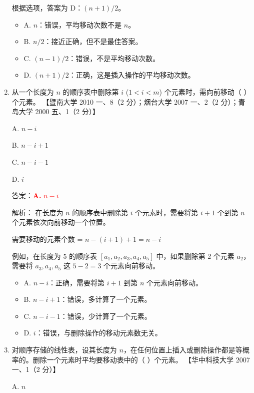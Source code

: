 \documentclass[lang=cn,newtx,10pt,scheme=chinese]{../../../elegantbook}
\begin{document}
\begin{enumerate}
        根据选项，答案为 D：$(n+1)/2$。

        \begin{itemize}
            \item A. $n$：错误，平均移动次数不是 $n$。
            \item B. $n/2$：接近正确，但不是最佳答案。
            \item C. $(n-1)/2$：错误，不是平均移动次数。
            \item D. $(n+1)/2$：正确，这是插入操作的平均移动次数。
        \end{itemize}

        \item 从一个长度为 $n$ 的顺序表中删除第 $i$ ($1 < i < m$) 个元素时，需向前移动（ ）个元素。  
        【暨南大学 2010 一、8（2 分）；烟台大学 2007 一、2（2 分）；青岛大学 2000 五、1（2 分）】  
    
        A. $n-i$  
    
        B. $n-i+1$  
    
        C. $n-i-1$  
    
        D. $i$  

        答案：\textcolor{red}{\textbf{A.} $n-i$}

        解析：
        在长度为 $n$ 的顺序表中删除第 $i$ 个元素时，需要将第 $i+1$ 个到第 $n$ 个元素依次向前移动一个位置。

        需要移动的元素个数 = $n - (i+1) + 1 = n - i$

        例如，在长度为 5 的顺序表 $[a_1, a_2, a_3, a_4, a_5]$ 中，如果删除第 2 个元素 $a_2$，需要将 $a_3, a_4, a_5$ 这 $5-2=3$ 个元素向前移动。

        \begin{itemize}
            \item A. $n-i$：正确，需要将第 $i+1$ 到第 $n$ 个元素向前移动。
            \item B. $n-i+1$：错误，多计算了一个元素。
            \item C. $n-i-1$：错误，少计算了一个元素。
            \item D. $i$：错误，与删除操作的移动元素数无关。
        \end{itemize}
    
        \item 对顺序存储的线性表，设其长度为 $n$，在任何位置上插入或删除操作都是等概率的。删除一个元素时平均要移动表中的（ ）个元素。  
        【华中科技大学 2007 一、1（2 分）】  
    
        A. $n$  
    

\end{enumerate}
\end{document}
